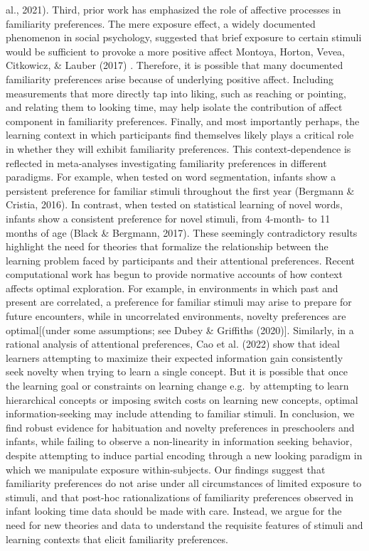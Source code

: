 \documentclass[10pt, letterpaper]{article}
\begin{document}
al., 2021). Third, prior work has emphasized the role of affective
processes in familiarity preferences. The mere exposure effect, a widely
documented phenomenon in social psychology, suggested that brief
exposure to certain stimuli would be sufficient to provoke a more
positive affect Montoya, Horton, Vevea, Citkowicz, \& Lauber (2017) .
Therefore, it is possible that many documented familiarity preferences
arise because of underlying positive affect. Including measurements that
more directly tap into liking, such as reaching or pointing, and
relating them to looking time, may help isolate the contribution of
affect component in familiarity preferences. Finally, and most
importantly perhaps, the learning context in which participants find
themselves likely plays a critical role in whether they will exhibit
familiarity preferences. This context-dependence is reflected in
meta-analyses investigating familiarity preferences in different
paradigms. For example, when tested on word segmentation, infants show a
persistent preference for familiar stimuli throughout the first year
(Bergmann \& Cristia, 2016). In contrast, when tested on statistical
learning of novel words, infants show a consistent preference for novel
stimuli, from 4-month- to 11 months of age (Black \& Bergmann, 2017).
These seemingly contradictory results highlight the need for theories
that formalize the relationship between the learning problem faced by
participants and their attentional preferences. Recent computational
work has begun to provide normative accounts of how context affects
optimal exploration. For example, in environments in which past and
present are correlated, a preference for familiar stimuli may arise to
prepare for future encounters, while in uncorrelated environments,
novelty preferences are optimal{[}(under some assumptions; see Dubey \&
Griffiths (2020){]}. Similarly, in a rational analysis of attentional
preferences, Cao et al. (2022) show that ideal learners attempting to
maximize their expected information gain consistently seek novelty when
trying to learn a single concept. But it is possible that once the
learning goal or constraints on learning change e.g.~by attempting to
learn hierarchical concepts or imposing switch costs on learning new
concepts, optimal information-seeking may include attending to familiar
stimuli. In conclusion, we find robust evidence for habituation and
novelty preferences in preschoolers and infants, while failing to
observe a non-linearity in information seeking behavior, despite
attempting to induce partial encoding through a new looking paradigm in
which we manipulate exposure within-subjects. Our findings suggest that
familiarity preferences do not arise under all circumstances of limited
exposure to stimuli, and that post-hoc rationalizations of familiarity
preferences observed in infant looking time data should be made with
care. Instead, we argue for the need for new theories and data to
understand the requisite features of stimuli and learning contexts that
elicit familiarity preferences.
\end{document}
